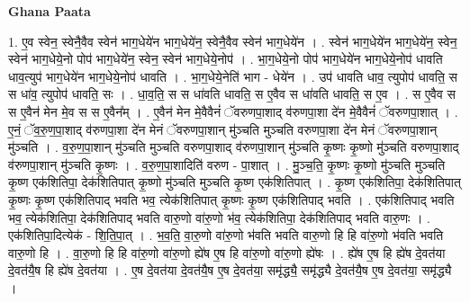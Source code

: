 \documentclass[17pt]{extarticle}
\begin{document}
\textbf{Ghana Paata } \newline

1. ए॒व स्वेन॒ स्वेनै॒वैव स्वेन॑ भाग॒धेये॑न भाग॒धेये॑न॒ स्वेनै॒वैव स्वेन॑ भाग॒धेये॑न । . स्वेन॑ भाग॒धेये॑न भाग॒धेये॑न॒ स्वेन॒ स्वेन॑ भाग॒धेये॒नो पोप॑ भाग॒धेये॑न॒ स्वेन॒ स्वेन॑ भाग॒धेये॒नोप॑ । . भा॒ग॒धेये॒नो पोप॑ भाग॒धेये॑न भाग॒धेये॒नोप॑ धावति धाव॒त्युप॑ भाग॒धेये॑न भाग॒धेये॒नोप॑ धावति । . भा॒ग॒धेये॒नेति॑ भाग - धेये॑न । . उप॑ धावति धाव॒ त्युपोप॑ धावति॒ स स धा॑व॒ त्युपोप॑ धावति॒ सः । . धा॒व॒ति॒ स स धा॑वति धावति॒ स ए॒वैव स धा॑वति धावति॒ स ए॒व । . स ए॒वैव स स ए॒वैन॑ मेन मे॒व स स ए॒वैन᳚म् । . ए॒वैन॑ मेन मे॒वैवैनं॑ ॅवरुणपा॒शाद् व॑रुणपा॒शा दे॑न मे॒वैवैनं॑ ॅवरुणपा॒शात् । . ए॒नं॒ ॅव॒रु॒ण॒पा॒शाद् व॑रुणपा॒शा दे॑न मेनं ॅवरुणपा॒शान् मु॑ञ्चति मुञ्चति वरुणपा॒शा दे॑न मेनं ॅवरुणपा॒शान् मु॑ञ्चति । . व॒रु॒ण॒पा॒शान् मु॑ञ्चति मुञ्चति वरुणपा॒शाद् व॑रुणपा॒शान् मु॑ञ्चति कृ॒ष्णः कृ॒ष्णो मु॑ञ्चति वरुणपा॒शाद् व॑रुणपा॒शान् मु॑ञ्चति कृ॒ष्णः । . व॒रु॒ण॒पा॒शादिति॑ वरुण - पा॒शात् । . मु॒ञ्च॒ति॒ कृ॒ष्णः कृ॒ष्णो मु॑ञ्चति मुञ्चति कृ॒ष्ण एक॑शितिपा॒ देक॑शितिपात् कृ॒ष्णो मु॑ञ्चति मुञ्चति कृ॒ष्ण एक॑शितिपात् । . कृ॒ष्ण एक॑शितिपा॒ देक॑शितिपात् कृ॒ष्णः कृ॒ष्ण एक॑शितिपाद् भवति भव॒ त्येक॑शितिपात् कृ॒ष्णः कृ॒ष्ण एक॑शितिपाद् भवति । . एक॑शितिपाद् भवति भव॒ त्येक॑शितिपा॒ देक॑शितिपाद् भवति वारु॒णो वा॑रु॒णो भ॑व॒ त्येक॑शितिपा॒ देक॑शितिपाद् भवति वारु॒णः । . एक॑शितिपा॒दित्येक॑ - शि॒ति॒पा॒त् । . भ॒व॒ति॒ वा॒रु॒णो वा॑रु॒णो भ॑वति भवति वारु॒णो हि हि वा॑रु॒णो भ॑वति भवति वारु॒णो हि । . वा॒रु॒णो हि हि वा॑रु॒णो वा॑रु॒णो ह्ये॑ष ए॒ष हि वा॑रु॒णो वा॑रु॒णो ह्ये॑षः । . ह्ये॑ष ए॒ष हि ह्ये॑ष दे॒वत॑या दे॒वत॑यै॒ष हि ह्ये॑ष दे॒वत॑या । . ए॒ष दे॒वत॑या दे॒वत॑यै॒ष ए॒ष दे॒वत॑या॒ समृ॑द्ध्यै॒ समृ॑द्ध्यै दे॒वत॑यै॒ष ए॒ष दे॒वत॑या॒ समृ॑द्ध्यै । \newline
\end{document}
